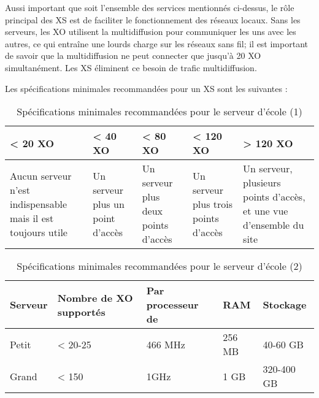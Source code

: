 \documentclass[12pt]{article}
\begin{document}
Aussi important que soit l'ensemble des services mentionnés ci-dessus, le
rôle principal des XS est de faciliter le fonctionnement des réseaux
locaux. Sans les serveurs, les XO utilisent la multidiffusion pour
communiquer les uns avec les autres, ce qui entraîne une lourds charge sur
les réseaux sans fil; il est important de savoir que la multidiffusion ne
peut connecter que jusqu'à 20 XO simultanément. Les XS éliminent ce besoin
de trafic multidiffusion. 

Les spécifications minimales recommandées pour un XS sont les suivantes :

\begin{table}[htb]
\caption{Spécifications minimales recommandées pour le serveur d'école (1)} 
\begin{center}
\begin{tabular}{|p{2.5cm}|p{2.5cm}|p{2.5cm}|p{2.5cm}|p{2.5cm}|}
\hline
 < 20 XO                                                       &  < 40 XO                           &  < 80 XO                              &  < 120 XO                              &  > 120 XO                                                             \\
\hline
 Aucun serveur n’est indispensable mais il est toujours utile  &  Un serveur plus un point d’accès  &  Un serveur plus deux points d’accès  &  Un serveur plus trois points d’accès  &  Un serveur, plusieurs points d’accès, et une vue d’ensemble du site  \\
\hline
\end{tabular}
\end{center}
\end{table}



\begin{table}[htb]
\caption{Spécifications minimales recommandées pour le serveur d'école (2)} 
\begin{center}
\begin{tabular}{|l|l|l|l|l|}
\hline
 Serveur  &  Nombre de XO supportés  &  Par processeur de  &  RAM     &  Stockage    \\
\hline
 Petit    &  < 20-25                 &  466 MHz            &  256 MB  &  40-60 GB    \\
 Grand    &  < 150                   &  1GHz               &  1 GB    &  320-400 GB  \\
\hline
\end{tabular}
\end{center}
\end{table}
\end{document}
